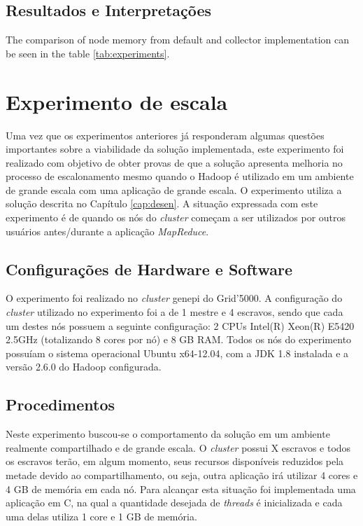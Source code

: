 \subsection{Resultados e Interpretações}
The comparison of node memory from default and collector implementation can be seen in the table \ref{tab:experiments}.

\section{Experimento de escala}
Uma vez que os experimentos anteriores já responderam algumas questões importantes sobre a viabilidade da solução implementada, este experimento foi realizado com objetivo de obter provas de que a solução apresenta melhoria no processo de escalonamento mesmo quando o Hadoop é utilizado em um ambiente de grande escala com uma aplicação de grande escala. O experimento utiliza a solução descrita no Capítulo \ref{cap:desen}. A situação expressada com este experimento é de quando os nós do \textit{cluster} começam a ser utilizados por outros usuários antes/durante a aplicação \textit{MapReduce}.

\subsection{Configurações de Hardware e Software}
O experimento foi realizado no \textit{cluster} genepi do Grid'5000. A configuração do \textit{cluster} utilizado no experimento foi a de 1 mestre e 4 escravos, sendo que cada um destes nós possuem a seguinte configuração: 2 CPUs Intel(R) Xeon(R) E5420 2.5GHz (totalizando 8 cores por nó) e 8 GB RAM. Todos os nós do experimento possuíam o sistema operacional Ubuntu x64-12.04, com a JDK 1.8 instalada e a versão 2.6.0 do Hadoop configurada.

\subsection{Procedimentos}
Neste experimento buscou-se o comportamento da solução em um ambiente realmente compartilhado e de grande escala. O \textit{cluster} possui X escravos e todos os escravos terão, em algum momento, seus recursos disponíveis reduzidos pela metade devido ao compartilhamento, ou seja, outra aplicação irá utilizar 4 cores e 4 GB de memória em cada nó. Para alcançar esta situação foi implementada uma aplicação em C, na qual a quantidade desejada de \textit{threads} é inicializada e cada uma delas utiliza 1 core e 1 GB de memória.


